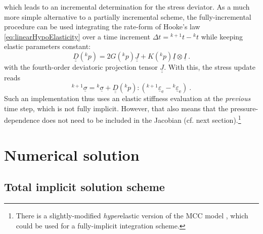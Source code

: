 \documentclass[paper=a4, twoside, pagesize]{scrartcl}
\newcommand{\tensor}[1]{\underline{#1}}
\newcommand{\tensorf}[1]{\underline{\underline{#1}}}
\newcommand{\e}{\text{e}}
\newcommand{\dyad}{\otimes}
\begin{document}
which leads to an incremental determination for the stress deviator. As a much more simple alternative to a partially incremental scheme, the fully-incremental procedure can be used integrating the rate-form of Hooke's law \eqref{eq:linearHypoElasticity} over a time increment $\varDelta t = {}^{k+1}t - {}^{k}t$ while keeping elastic parameters constant:
\begin{equation}\label{eq:elasticityTensorFromPreviousPressure}
  \tensorf D({}^{k}p) = 2G({}^{k}p) \tensorf J + K({}^{k}p) \tensor I\dyad\tensor I \ .
\end{equation}
with the fourth-order deviatoric projection tensor $\tensorf J$. With this, the stress update reads
\begin{equation}
  ^{k+1}\tensor\sigma = {}^{k}\tensor\sigma + \tensorf D({}^{k}p) : \left({}^{k+1}\tensor\varepsilon_\e - {}^{k}\tensor\varepsilon_\e \right) \ .    
\end{equation}
Such an implementation thus uses an elastic stiffness evaluation at the \emph{previous} time step, which is not fully implicit. However, that also means that the pressure-dependence does not need to be included in the Jacobian (cf. next section).\footnote{There is a slightly-modified \emph{hyper}elastic version of the MCC model \cite{Houlsby1985}, which could be used for a fully-implicit integration scheme.}

\section{Numerical solution}

\subsection{Total implicit solution scheme}
\end{document}
